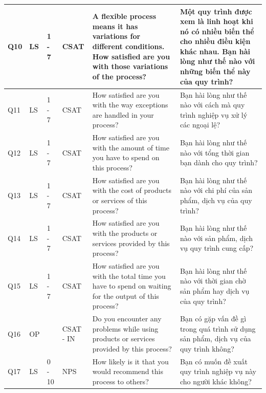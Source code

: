 \begin{center}
    \begin{tabular}{|p{0.8cm} |p{1.5cm} |p{1cm}| p{0.8cm} | p{5cm} | p{5cm} |}
        \hline
            Q10 & LS & 1 - 7 & CSAT & A flexible process means it has variations for different conditions. How satisfied are you with those variations of the process? & Một quy trình được xem là linh hoạt khi nó có nhiều biến thể cho nhiều điều kiện khác nhau. Bạn hài lòng như thế nào với những biến thể này của quy trình? \\
        \hline
            Q11 & LS & 1 - 7 & CSAT & How satisfied are you with the way exceptions are handled in your process? & Bạn hài lòng như thế nào với cách mà quy trình nghiệp vụ xử lý các ngoại lệ? \\
        \hline
            Q12 & LS & 1 - 7 & CSAT & How satisfied are you with the amount of time you have to spend on this process? & Bạn hài lòng như thế nào với tổng thời gian bạn dành cho quy trình? \\
        \hline
            Q13 & LS & 1 - 7 & CSAT & How satisfied are you with the cost of products or services of this process? & Bạn hài lòng như thế nào với chi phí của sản phẩm, dịch vụ của quy trình? \\
        \hline
            Q14 & LS & 1 - 7 & CSAT & How satisfied are you with the products or services provided by this process? & Bạn hài lòng như thế nào với sản phẩm, dịch vụ quy trình cung cấp? \\
        \hline
            Q15 & LS & 1 - 7 & CSAT & How satisfied are you with the total time you have to spend on waiting for the output of this process? & Bạn hài lòng như thế nào với thời gian chờ sản phẩm hay dịch vụ của quy trình? \\
        \hline
            Q16 & OP &  & CSAT - IN & Do you encounter any problems while using products or services provided by this process? & Bạn có gặp vấn đề gì trong quá trình sử dụng sản phẩm, dịch vụ của quy trình không? \\
        \hline
            Q17 & LS & 0 - 10 & NPS & How likely is it that you would recommend this process to others? & Bạn có muốn đề xuất quy trình nghiệp vụ này cho người khác không? \\ [1ex]
        \hline
    \end{tabular}
\end{center}

